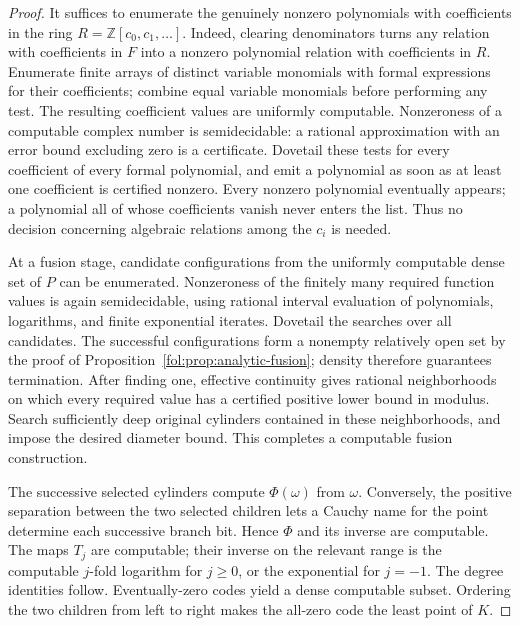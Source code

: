 \documentclass[11pt,a4paper]{article}
\theoremstyle{definition}
\theoremstyle{remark}
\numberwithin{equation}{section}
\begin{document}
\begin{proof}
It suffices to enumerate the genuinely nonzero polynomials with
coefficients in the ring $R=\mathbb Z[c_0,c_1,\ldots]$. Indeed, clearing
denominators turns any relation with coefficients in $F$ into a nonzero
polynomial relation with coefficients in $R$. Enumerate finite arrays of distinct variable monomials with formal
expressions for their coefficients; combine equal variable monomials
before performing any test. The resulting coefficient values are
uniformly computable. Nonzeroness of a computable complex number is semidecidable:
a rational approximation with an error bound excluding zero is a
certificate. Dovetail these tests for every coefficient of every formal
polynomial, and emit a polynomial as soon as at least one coefficient is
certified nonzero. Every nonzero polynomial eventually appears; a
polynomial all of whose coefficients vanish never enters the list.
Thus no decision concerning algebraic relations among the $c_i$ is
needed.

At a fusion stage, candidate configurations from the uniformly
computable dense set of $P$ can be enumerated. Nonzeroness of the finitely
many required function values is again semidecidable, using rational
interval evaluation of polynomials, logarithms, and finite exponential iterates.
Dovetail the searches over all candidates. The successful configurations
form a nonempty relatively open set by the proof of
Proposition~\ref{fol:prop:analytic-fusion}; density therefore guarantees
termination. After finding one, effective continuity gives rational
neighborhoods on which every required value has a certified positive
lower bound in modulus. Search sufficiently deep original cylinders
contained in these neighborhoods, and impose the desired diameter
bound. This completes a computable fusion construction.

The successive selected cylinders compute $\Phi(\omega)$ from
$\omega$. Conversely, the positive separation between the two selected
children lets a Cauchy name for the point determine each successive
branch bit. Hence $\Phi$ and its inverse are computable. The maps $T_j$
are computable; their inverse on the relevant range is the computable
$j$-fold logarithm for $j\ge0$, or the exponential for $j=-1$. The degree identities follow. Eventually-zero codes
yield a dense computable subset. Ordering the two children from left to
right makes the all-zero code the least point of $K$.
\end{proof}
\end{document}
